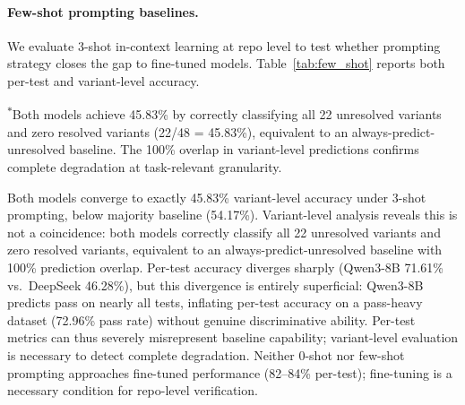 \paragraph{Few-shot prompting baselines.}
\label{app:few_shot}
We evaluate 3-shot in-context learning at repo level to test whether prompting strategy closes the gap to fine-tuned models. Table~\ref{tab:few_shot} reports both per-test and variant-level accuracy.

\begin{table}[h]
\centering
\small
\caption{Repo-level prompting baselines (per-test $n{=}9{,}784$; variant-level $n{=}48$). Majority baseline: 72.96\% per-test, 54.17\% variant-level.}
\label{tab:few_shot}
\setlength{\tabcolsep}{4pt}

\vspace{2pt}
{\footnotesize \textsuperscript{$\ast$}Both models achieve 45.83\% by correctly classifying all 22 unresolved variants and zero resolved variants (22/48 = 45.83\%), equivalent to an always-predict-unresolved baseline. The 100\% overlap in variant-level predictions confirms complete degradation at task-relevant granularity.}
\end{table}

Both models converge to exactly 45.83\% variant-level accuracy under 3-shot prompting, below majority baseline (54.17\%). Variant-level analysis reveals this is not a coincidence: both models correctly classify all 22 unresolved variants and zero resolved variants, equivalent to an always-predict-unresolved baseline with 100\% prediction overlap. Per-test accuracy diverges sharply (Qwen3-8B 71.61\% vs.\ DeepSeek 46.28\%), but this divergence is entirely superficial: Qwen3-8B predicts pass on nearly all tests, inflating per-test accuracy on a pass-heavy dataset (72.96\% pass rate) without genuine discriminative ability. Per-test metrics can thus severely misrepresent baseline capability; variant-level evaluation is necessary to detect complete degradation. Neither 0-shot nor few-shot prompting approaches fine-tuned performance (82--84\% per-test); fine-tuning is a necessary condition for repo-level verification.

